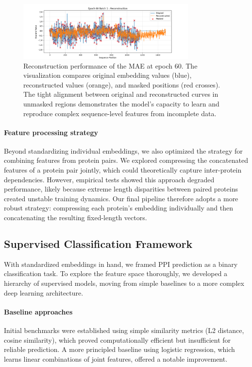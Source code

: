 \documentclass{article}
\begin{document}
	\begin{figure}[h]
		\centering
		\includegraphics[width=0.8\textwidth]{imgs/epoch60_batch1.png}
		\caption{Reconstruction performance of the MAE at epoch 60. The visualization compares original embedding values (blue), reconstructed values (orange), and masked positions (red crosses). The tight alignment between original and reconstructed curves in unmasked regions demonstrates the model's capacity to learn and reproduce complex sequence-level features from incomplete data.}
		\label{fig:mae_recon}
	\end{figure}
	
	\paragraph{Feature processing strategy} Beyond standardizing individual embeddings, we also optimized the strategy for combining features from protein pairs. We explored compressing the concatenated features of a protein pair jointly, which could theoretically capture inter-protein dependencies. However, empirical tests showed this approach degraded performance, likely because extreme length disparities between paired proteins created unstable training dynamics. Our final pipeline therefore adopts a more robust strategy: compressing each protein's embedding individually and then concatenating the resulting fixed-length vectors.
	
	
	\subsection{Supervised Classification Framework}

	With standardized embeddings in hand, we framed PPI prediction as a binary classification task. To explore the feature space thoroughly, we developed a hierarchy of supervised models, moving from simple baselines to a more complex deep learning architecture.

	\paragraph{Baseline approaches} Initial benchmarks were established using simple similarity metrics (L2 distance, cosine similarity), which proved computationally efficient but insufficient for reliable prediction. A more principled baseline using logistic regression, which learns linear combinations of joint features, offered a notable improvement.
\end{document}
